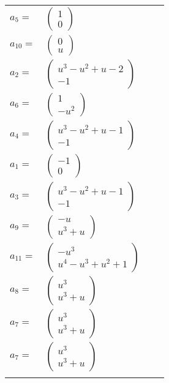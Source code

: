 \documentclass[1p]{elsarticle_modified}
\theoremstyle{definition}
\begin{document}
\begin{tabular}{m{7pt} m{180pt} m{7pt} m{180pt} }
\flushright $a_{5}=$&$\begin{pmatrix}1\\0\end{pmatrix}$ \\
\flushright $a_{10}=$&$\begin{pmatrix}0\\u\end{pmatrix}$ \\
\flushright $a_{2}=$&$\begin{pmatrix}u^3- u^2+u-2\\-1\end{pmatrix}$ \\
\flushright $a_{6}=$&$\begin{pmatrix}1\\- u^2\end{pmatrix}$ \\
\flushright $a_{4}=$&$\begin{pmatrix}u^3- u^2+u-1\\-1\end{pmatrix}$ \\
\flushright $a_{1}=$&$\begin{pmatrix}-1\\0\end{pmatrix}$ \\
\flushright $a_{3}=$&$\begin{pmatrix}u^3- u^2+u-1\\-1\end{pmatrix}$ \\
\flushright $a_{9}=$&$\begin{pmatrix}- u\\u^3+u\end{pmatrix}$ \\
\flushright $a_{11}=$&$\begin{pmatrix}- u^3\\u^4- u^3+u^2+1\end{pmatrix}$ \\
\flushright $a_{8}=$&$\begin{pmatrix}u^3\\u^3+u\end{pmatrix}$ \\
\flushright $a_{7}=$&$\begin{pmatrix}u^3\\u^3+u\end{pmatrix}$\\ \flushright $a_{7}=$&$\begin{pmatrix}u^3\\u^3+u\end{pmatrix}$\\&\end{tabular}
\end{document}

